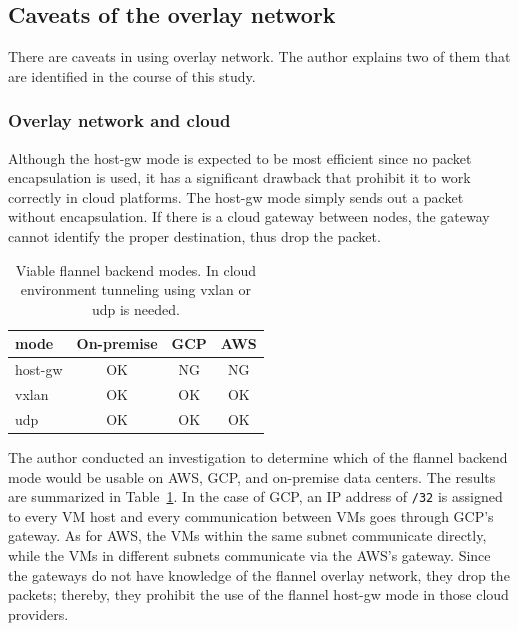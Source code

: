 \FloatBarrier

\subsection{Caveats of the overlay network}

There are caveats in using overlay network.
The author explains two of them that are identified in the course of this study.

\subsubsection{Overlay network and cloud}

Although the host-gw mode is expected to be most efficient since no packet encapsulation is used, it has a significant drawback that prohibit it to work correctly in cloud platforms. 
The host-gw mode simply sends out a packet without encapsulation.
If there is a cloud gateway between nodes, the gateway cannot identify the proper destination, thus drop the packet.

\begin{table}
  \centering
  \begin{tabular}{lccc}
    \toprule
    mode & On-premise & GCP & AWS \\
    \midrule
    host-gw & OK & NG & NG \\
    vxlan & OK & OK & OK \\
    udp & OK & OK & OK \\
    \bottomrule
\end{tabular}

  \caption{Viable flannel backend modes. In cloud environment tunneling using vxlan or udp is needed.}
  \label{tab:Viable flannel backends}
\end{table}

The author conducted an investigation to determine which of the flannel backend mode would be usable on AWS, GCP, and on-premise data centers.
The results are summarized in Table~\ref{tab:Viable flannel backends}. 
In the case of GCP, an IP address of {\tt /32} is assigned to every VM host and 
every communication between VMs goes through GCP's gateway.
As for AWS, the VMs within the same subnet communicate directly, while the VMs in different subnets communicate via the AWS's gateway.
Since the gateways do not have knowledge of the flannel overlay network, they drop the packets; thereby, 
they prohibit the use of the flannel host-gw mode in those cloud providers.  

